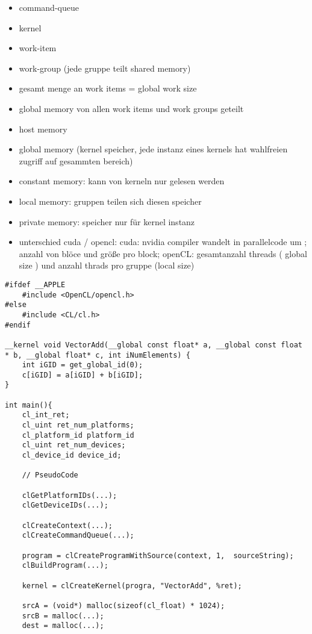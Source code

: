 \documentclass{article}
\begin{document}
\begin{multicols}{2}
\begin{itemize}
    \item command-queue
    \item kernel
    \item work-item
    \item work-group (jede gruppe teilt shared memory)
    \item gesamt menge an work items  = global work size
    \item global memory von allen work items und work groups geteilt
    \item host memory
    \item global memory (kernel speicher, jede instanz eines kernels hat wahlfreien zugriff auf gesammten bereich)
    \item constant memory: kann von kerneln nur gelesen werden
    \item local memory: gruppen  teilen sich diesen speicher
    \item private memory: speicher nur für kernel instanz 
    \item unterschied cuda / opencl: cuda: nvidia compiler wandelt in parallelcode um ; anzahl von blöce und größe pro block; openCL: gesamtanzahl threads ( global size ) und anzahl thrads pro gruppe (local size) 
\end{itemize}

\begin{verbatim}
#ifdef __APPLE
    #include <OpenCL/opencl.h>
#else
    #include <CL/cl.h>
#endif

__kernel void VectorAdd(__global const float* a, __global const float * b, __global float* c, int iNumElements) {
    int iGID = get_global_id(0);
    c[iGID] = a[iGID] + b[iGID];
}    

int main(){
    cl_int_ret;
    cl_uint ret_num_platforms;
    cl_platform_id platform_id
    cl_uint ret_num_devices;
    cl_device_id device_id;
    
    // PseudoCode
    
    clGetPlatformIDs(...);
    clGetDeviceIDs(...);
    
    clCreateContext(...);
    clCreateCommandQueue(...);
    
    program = clCreateProgramWithSource(context, 1,  sourceString);
    clBuildProgram(...);
    
    kernel = clCreateKernel(progra, "VectorAdd", %ret);
    
    srcA = (void*) malloc(sizeof(cl_float) * 1024);
    srcB = malloc(...);
    dest = malloc(...);
    

\end{verbatim}
\end{multicols}
\end{document}
